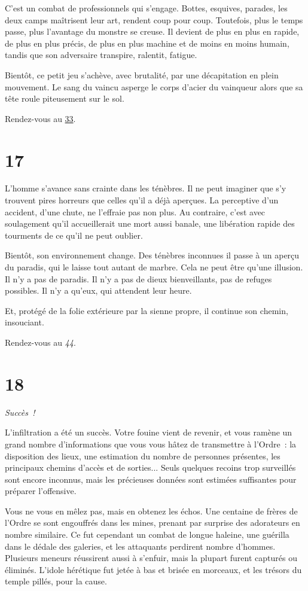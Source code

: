 \documentclass{report}
\newcommand{\gsection}[1]{
    \section{#1}
    \label{section-#1}
}
\newcommand{\glink}[1]{\hyperref[section-#1]{#1}}
\newcommand{\success}{\emph{Succès !}}
\begin{document}
C'est un combat de professionnels qui s'engage. Bottes, esquives, parades, les deux camps maîtrisent leur art, rendent coup pour coup. Toutefois, plus le temps passe, plus l'avantage du monstre se creuse. Il devient de plus en plus en rapide, de plus en plus précis, de plus en plus machine et de moins en moins humain, tandis que son adversaire transpire, ralentit, fatigue.

Bientôt, ce petit jeu s'achève, avec brutalité, par une décapitation en plein mouvement. Le sang du vaincu asperge le corps d'acier du vainqueur alors que sa tête roule piteusement sur le sol.

Rendez-vous au \glink{33}.

\gsection{17}

L'homme s'avance sans crainte dans les ténèbres. Il ne peut imaginer que s'y trouvent pires horreurs que celles qu'il a déjà aperçues. La perceptive d'un accident, d'une chute, ne l'effraie pas non plus. Au contraire, c'est avec soulagement qu'il accueillerait une mort aussi banale, une libération rapide des tourments de ce qu'il ne peut oublier.

Bientôt, son environnement change. Des ténèbres inconnues il passe à un aperçu du paradis, qui le laisse tout autant de marbre. Cela ne peut être qu'une illusion. Il n'y a pas de paradis. Il n'y a pas de dieux bienveillants, pas de refuges possibles. Il n'y a qu'eux, qui attendent leur heure.

Et, protégé de la folie extérieure par la sienne propre, il continue son chemin, insouciant.

Rendez-vous au \emph{44}.

\gsection{18}

\success

L'infiltration a été un succès. Votre fouine vient de revenir, et vous ramène un grand nombre d'informations que vous vous hâtez de transmettre à l'Ordre : la disposition des lieux, une estimation du nombre de personnes présentes, les principaux chemins d'accès et de sorties... Seuls quelques recoins trop surveillés sont encore inconnus, mais les précieuses données sont estimées suffisantes pour préparer l'offensive.

Vous ne vous en mêlez pas, mais en obtenez les échos. Une centaine de frères de l'Ordre se sont engouffrés dans les mines, prenant par surprise des adorateurs en nombre similaire. Ce fut cependant un combat de longue haleine, une guérilla dans le dédale des galeries, et les attaquants perdirent nombre d'hommes. Plusieurs meneurs réussirent aussi à s'enfuir, mais la plupart furent capturés ou éliminés. L'idole hérétique fut jetée à bas et brisée en morceaux, et les trésors du temple pillés, pour la cause.
\end{document}
